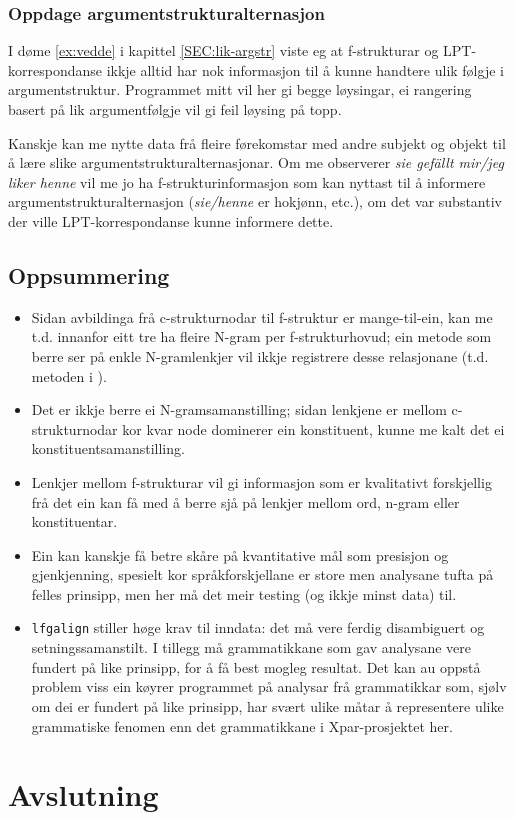 \documentclass[11pt,a4paper,oneside,draft]{report}
\begin{document}
\subsection{Oppdage argumentstrukturalternasjon}
\label{sec-5.5.1}

 I døme \ref{ex:vedde} i kapittel \ref{SEC:lik-argstr} viste eg at
 f-strukturar og LPT-korrespondanse ikkje alltid har nok informasjon
 til å kunne handtere ulik følgje i argumentstruktur. Programmet mitt
 vil her gi begge løysingar, ei rangering basert på lik argumentfølgje
 vil gi feil løysing på topp.

 Kanskje kan me nytte data frå fleire førekomstar med andre subjekt og
 objekt til å lære slike argumentstrukturalternasjonar.  Om me
 observerer \emph{sie gefällt mir/jeg liker henne} vil me jo ha
 f-strukturinformasjon som kan nyttast til å informere
 argumentstrukturalternasjon (\emph{sie/henne} er hokjønn, etc.), om det
 var substantiv der ville LPT-korrespondanse kunne informere dette.
\section{Oppsummering}
\label{sec-5.6}

\begin{itemize}
\item Sidan avbildinga frå c-strukturnodar til f-struktur er
   mange-til-ein, kan me t.d. innanfor eitt tre ha fleire N-gram per
   f-strukturhovud; ein metode som berre ser på enkle N-gramlenkjer
   vil ikkje registrere desse relasjonane (t.d. metoden i
   \citet{samuelsson2007apa}).
\item Det er ikkje berre ei N-gramsamanstilling; sidan
   lenkjene er mellom c-strukturnodar kor kvar node dominerer ein
   konstituent, kunne me kalt det ei konstituentsamanstilling.
\item Lenkjer mellom f-strukturar vil gi informasjon som er kvalitativt
   forskjellig frå det ein kan få med å berre sjå på lenkjer mellom
   ord, n-gram eller konstituentar.
\item Ein kan kanskje få betre skåre på kvantitative mål som presisjon og
   gjenkjenning, spesielt kor språkforskjellane er store men analysane
   tufta på felles prinsipp, men her må det meir testing (og ikkje
   minst data) til.
\item \texttt{lfgalign} stiller høge krav til inndata: det må vere ferdig
   disambiguert og setningssamanstilt. I tillegg må grammatikkane som
   gav analysane vere fundert på like prinsipp, for å få best mogleg
   resultat. Det kan au oppstå problem viss ein køyrer programmet på
   analysar frå grammatikkar som, sjølv om dei er fundert på like
   prinsipp, har svært ulike måtar å representere ulike grammatiske
   fenomen enn det grammatikkane i Xpar-prosjektet her.
\end{itemize}
\chapter{Avslutning}
\label{sec-6}




\end{document}
